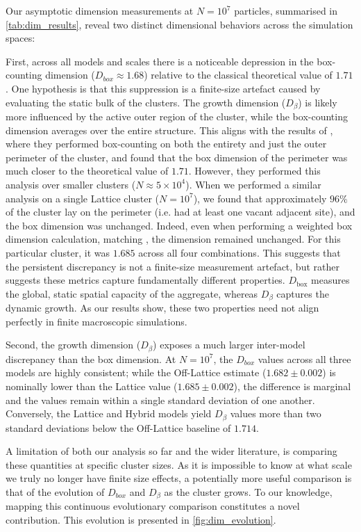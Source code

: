 \documentclass[12pt, a4paper, oneside]{report}
\theoremstyle{remark}
\begin{document}
Our asymptotic dimension measurements at $N=10^7$ particles, summarised in \cref{tab:dim_results}, reveal two distinct dimensional behaviors across the simulation spaces:

First, across all models and scales there is a noticeable depression in the box-counting dimension ($D_{box} \approx 1.68$) relative to the classical theoretical value of $1.71$. 
One hypothesis is that this suppression is a finite-size artefact caused by evaluating the static bulk of the clusters. The growth dimension ($D_{\beta}$) is likely more influenced by the active outer region of the cluster, while the box-counting dimension averages over the entire structure. This aligns with the results of \cite{Hanan2001}, where they performed box-counting on both the entirety and just the outer perimeter of the cluster, and found that the box dimension of the perimeter was much closer to the theoretical value of $1.71$. However, they performed this analysis over smaller clusters ($N \approx 5 \times 10^4$). When we performed a similar analysis on a single Lattice cluster ($N = 10^7$), we found that approximately $96\%$ of the cluster lay on the perimeter (i.e. had at least one vacant adjacent site), and the box dimension was unchanged. Indeed, even when performing a weighted box dimension calculation, matching \cite{Hanan2001}, the dimension remained unchanged. For this particular cluster, it was $1.685$ across all four combinations. This suggests that the persistent discrepancy is not a finite-size measurement artefact, but rather suggests these metrics capture fundamentally different properties. $D_{\mathrm{box}}$ measures the global, static spatial capacity of the aggregate, whereas $D_{\beta}$ captures the dynamic growth. As our results show, these two properties need not align perfectly in finite macroscopic simulations.

Second, the growth dimension ($D_{\beta}$) exposes a much larger inter-model discrepancy than the box dimension. At $N=10^7$, the $D_{box}$ values across all three models are highly consistent; while the Off-Lattice estimate ($1.682 \pm 0.002$) is nominally lower than the Lattice value ($1.685 \pm 0.002$), the difference is marginal and the values remain within a single standard deviation of one another. Conversely, the Lattice and Hybrid models yield $D_{\beta}$ values more than two standard deviations below the Off-Lattice baseline of $1.714$.

A limitation of both our analysis so far and the wider literature, is comparing these quantities at specific cluster sizes. As it is impossible to know at what scale we truly no longer have finite size effects, a potentially more useful comparison is that of the evolution of $D_{box}$ and $D_\beta$ as the cluster grows. To our knowledge, mapping this continuous evolutionary comparison constitutes a novel contribution. This evolution is presented in \cref{fig:dim_evolution}.
\end{document}
